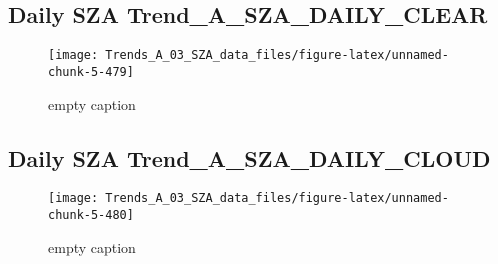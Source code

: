 \documentclass[
  10pt,
  a4paper,oneside]{article}
\begin{document}
\FloatBarrier

\hypertarget{daily-sza-trend_a_sza_daily_clear}{%
\subsection{Daily SZA Trend\_A\_SZA\_DAILY\_CLEAR}\label{daily-sza-trend_a_sza_daily_clear}}

\begin{figure}[!ht]

{\centering \texttt{[image: Trends\_A\_03\_SZA\_data\_files/figure-latex/unnamed-chunk-5-479]} 

}

\caption{ empty caption }\label{fig:unnamed-chunk-5-479}
\end{figure}

\FloatBarrier

\hypertarget{daily-sza-trend_a_sza_daily_cloud}{%
\subsection{Daily SZA Trend\_A\_SZA\_DAILY\_CLOUD}\label{daily-sza-trend_a_sza_daily_cloud}}

\begin{figure}[!ht]

{\centering \texttt{[image: Trends\_A\_03\_SZA\_data\_files/figure-latex/unnamed-chunk-5-480]} 

}

\caption{ empty caption }\label{fig:unnamed-chunk-5-480}
\end{figure}
\end{document}
